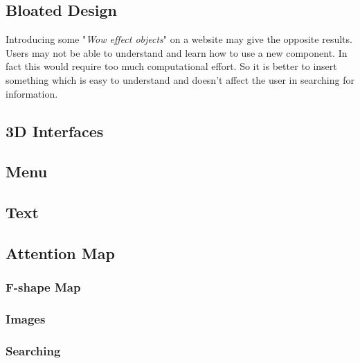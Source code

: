 \subsection{Bloated Design}
Introducing some "\textit{Wow effect objects}" on a website may give the opposite results. Users may
not be able to understand and learn how to use a new component. In fact this would require too
much computational effort. So it is better to insert something which is easy to understand and
doesn't affect the user in searching for information.

\subsection{3D Interfaces}

\subsection{Menu}

\subsection{Text}

\subsection{Attention Map}

\subsubsection{F-shape Map}

\subsubsection{Images}

\subsubsection{Searching}